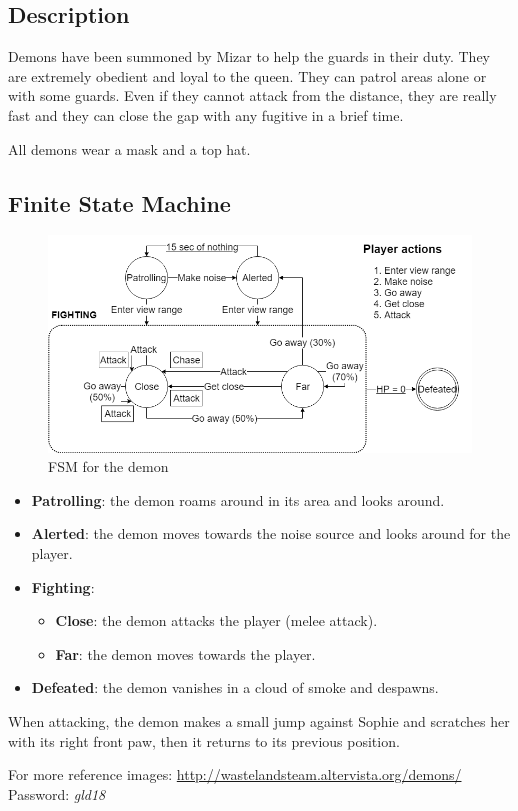 \subsection{Description}
Demons have been summoned by Mizar to help the guards in their duty. They are extremely obedient and loyal to the queen. They can patrol areas alone or with some guards. Even if they cannot attack from the distance, they are really fast and they can close the gap with any fugitive in a brief time.

All demons wear a mask and a top hat.

\subsection{Finite State Machine}
\begin{figure}[H]
  \centering
  \includegraphics[width=\textwidth]{Images/Diagrams/FSMs/demonFSM}
  \caption{FSM for the demon}
\end{figure}

\begin{itemize}
	\item \textbf{Patrolling}: the demon roams around in its area and looks around.
	\item \textbf{Alerted}: the demon moves towards the noise source and looks around for the player.
	\item \textbf{Fighting}:
	\begin{itemize}
		\item \textbf{Close}: the demon attacks the player (melee attack).
		\item \textbf{Far}: the demon moves towards the player.
	\end{itemize}
	\item \textbf{Defeated}: the demon vanishes in a cloud of smoke and despawns.
\end{itemize}

When attacking, the demon makes a small jump against Sophie and scratches her with its right front paw, then it returns to its previous position.

For more reference images: \url{http://wastelandsteam.altervista.org/demons/}\\
Password: \textit{gld18}
